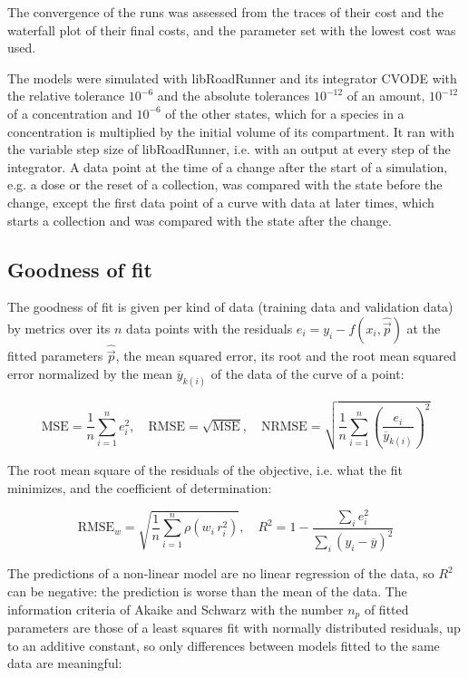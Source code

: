 The convergence of the runs was assessed from the traces of their cost and the waterfall plot of their final costs, and the parameter set with the lowest cost was used.

The models were simulated with libRoadRunner \cite{Welsh2023} and its integrator CVODE \cite{Hindmarsh2005} with the relative tolerance $10^{-6}$ and the absolute tolerances $10^{-12}$ of an amount, $10^{-12}$ of a concentration and $10^{-6}$ of the other states, which for a species in a concentration is multiplied by the initial volume of its compartment. It ran with the variable step size of libRoadRunner, i.e. with an output at every step of the integrator. A data point at the time of a change after the start of a simulation, e.g. a dose or the reset of a collection, was compared with the state before the change, except the first data point of a curve with data at later times, which starts a collection and was compared with the state after the change.

\subsection{Goodness of fit}

The goodness of fit is given per kind of data (training data and validation data) by metrics over its $n$ data points with the residuals $e_i = y_i - f(x_i, \hat{\vec{p}})$ at the fitted parameters $\hat{\vec{p}}$, the mean squared error, its root and the root mean squared error normalized by the mean $\overline{y}_{k(i)}$ of the data of the curve of a point:

\begin{equation}
\mathrm{MSE} = \frac{1}{n} \sum_{i=1}^{n} e_i^2, \quad \mathrm{RMSE} = \sqrt{\mathrm{MSE}}, \quad \mathrm{NRMSE} = \sqrt{\frac{1}{n} \sum_{i=1}^{n} \left(\frac{e_i}{\overline{y}_{k(i)}}\right)^2}
\end{equation}

The root mean square of the residuals of the objective, i.e. what the fit minimizes, and the coefficient of determination:

\begin{equation}
\mathrm{RMSE}_w = \sqrt{\frac{1}{n} \sum_{i=1}^{n} \rho\left(w_i\, r_i^2\right)}, \quad R^2 = 1 - \frac{\sum_{i} e_i^2}{\sum_{i} \left(y_i - \overline{y}\right)^2}
\end{equation}

The predictions of a non-linear model are no linear regression of the data, so $R^2$ can be negative: the prediction is worse than the mean of the data. The information criteria of Akaike \cite{Akaike1974} and Schwarz \cite{Schwarz1978} with the number $n_p$ of fitted parameters are those of a least squares fit with normally distributed residuals, up to an additive constant, so only differences between models fitted to the same data are meaningful:

